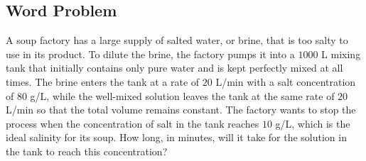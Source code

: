 \documentclass[09pt,letterpaper]{article}
\begin{document}
\subsection{Word Problem}
A soup factory has a large supply of salted water, or brine, that is too salty to use in its product. To dilute the brine, the factory pumps it into a $1000$ L mixing tank that initially contains only pure water and is kept perfectly mixed at all times. The brine enters the tank at a rate of $20$ L/min with a salt concentration of $80$ g/L, while the well-mixed solution leaves the tank at the same rate of $20$ L/min so that the total volume remains constant. The factory wants to stop the process when the concentration of salt in the tank reaches $10$ g/L, which is the ideal salinity for its soup. How long, in minutes, will it take for the solution in the tank to reach this concentration?
\end{document}
